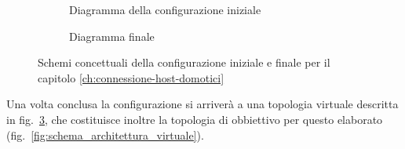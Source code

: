 \begin{figure}[H]
    \centering
    \begin{subfigure}{0.44\linewidth}
        \centering
        \usebox{\myimage}
        \caption{Diagramma della configurazione iniziale}
        \label{fig:diag2-host_real}
    \end{subfigure}
    \hfill
    \begin{subfigure}{0.53\linewidth}
        \centering
        \caption{Diagramma finale}
        \label{fig:diag2-host_virtual}
    \end{subfigure}
    \caption{Schemi concettuali della configurazione iniziale e finale per il capitolo \ref{ch:connessione-host-domotici}}
\end{figure}

Una volta conclusa la configurazione si arriverà a una topologia virtuale descritta in fig.~\ref{fig:diag2-host_virtual}, che costituisce inoltre la topologia di obbiettivo per questo elaborato (fig.~\ref{fig:schema_architettura_virtuale}).

